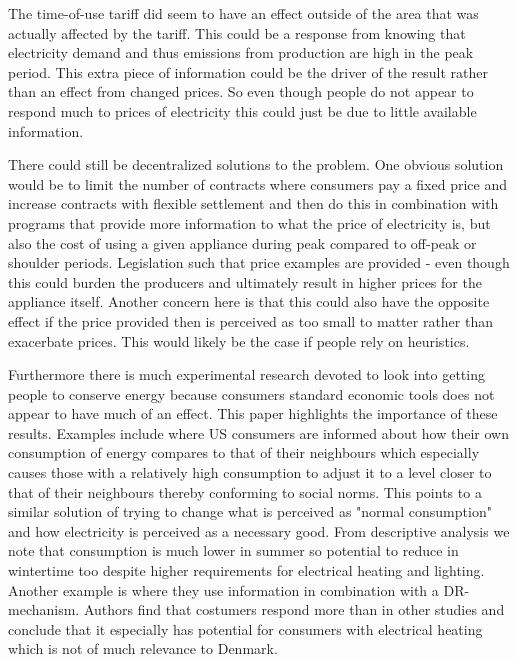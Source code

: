 The time-of-use tariff did seem to have an effect outside of the area that was actually affected by the tariff. This could be a response from knowing that electricity demand and thus emissions from production are high in the peak period. This extra piece of information could be the driver of the result rather than an effect from changed prices. So even though people do not appear to respond much to prices of electricity this could just be due to little available information.
\par

There could still be decentralized solutions to the problem. One obvious solution would be to limit the number of contracts where consumers pay a fixed price and increase contracts with flexible settlement and then do this in combination with programs that provide more information to what the price of electricity is, but also the cost of using a given appliance during peak compared to off-peak or shoulder periods. Legislation such that price examples are provided - even though this could burden the producers and ultimately result in higher prices for the appliance itself. Another concern here is that this could also have the opposite effect if the price provided then is perceived as too small to matter rather than exacerbate prices. This would likely be the case if people rely on heuristics.
\par

Furthermore there is much experimental research devoted to look into getting people to conserve energy because consumers standard economic tools does not appear to have much of an effect. This paper highlights the importance of these results. Examples include \citep{allcott2011social} where US consumers are informed about how their own consumption of energy compares to that of their neighbours which especially causes those with a relatively high consumption to adjust it to a level closer to that of their neighbours thereby conforming to social norms. This points to a similar solution of trying to change what is perceived as "normal consumption" and how electricity is perceived as a necessary good. From descriptive analysis we note that consumption is much lower in summer so potential to reduce in wintertime too despite higher requirements for electrical heating and lighting. Another example is \citep{saele2011demand} where they use information in combination with a DR-mechanism. Authors find that costumers respond more than in other studies and conclude that it especially has potential for consumers with electrical heating which is not of much relevance to Denmark.
\par

